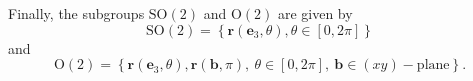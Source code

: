 \documentclass[11pt,a4paper]{amsart}
\theoremstyle{definition}
\newcommand{\OO}{\mathrm{O}}                %
\newcommand{\SO}{\mathrm{SO}}               %
\newcommand{\DD}{\mathbb{D}}                %
\newcommand{\1}{\mathds{1}}		            %
\newcommand{\ee}{\pmb{e}}                   %
\newcommand{\uu}{\pmb{u}}                   %
\newcommand{\vv}{\pmb{v}}                   %
\newcommand{\vR}{\mathbf{r}}
\newcommand{\bb}{\mathbf{b}}
\newcommand{\set}[1]{\left\{#1\right\}}     %
\begin{document}
Finally, the subgroups $\SO(2)$ and $\OO(2)$ are given by
\begin{equation}\label{eq:SO(2)}
\SO(2)=\set{\vR(\ee_3,\theta),\theta\in[0,2\pi]}
\end{equation}
and 
\begin{equation}\label{eq:O(2)}
\OO(2)=\set{\vR(\ee_3,\theta),\vR(\bb,\pi),\  \theta\in[0,2\pi],\ \bb\in (xy)-\text{plane}}.
\end{equation}


\end{document}
